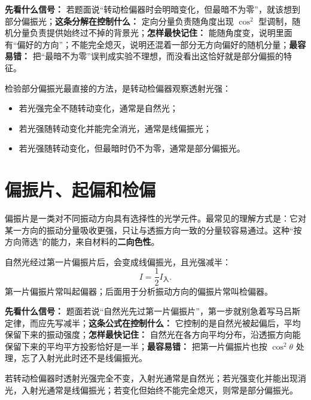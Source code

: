 \documentclass[lang=cn,11pt]{elegantbook}
\begin{document}
\begin{note}
\textbf{先看什么信号：} 若题面说“转动检偏器时会明暗变化，但最暗不为零”，就该想到部分偏振光；\textbf{这条分解在控制什么：} 定向分量负责随角度出现 \(\cos^2\) 型调制，随机分量负责提供始终过不掉的背景光；\textbf{怎样最快记住：} 能随角度变，说明里面有“偏好的方向”；不能完全熄灭，说明还混着一部分无方向偏好的随机分量；\textbf{最容易错：} 把“最暗不为零”误判成实验不理想，而没看出这恰好就是部分偏振的特征。
\end{note}

\begin{remark}
检验部分偏振光最直接的方法，是转动检偏器观察透射光强：
\begin{itemize}
  \item 若光强完全不随转动变化，通常是自然光；
  \item 若光强随转动变化并能完全消光，通常是线偏振光；
  \item 若光强随转动变化，但最暗时仍不为零，通常是部分偏振光。
\end{itemize}
\end{remark}

\section{偏振片、起偏和检偏}

偏振片是一类对不同振动方向具有选择性的光学元件。最常见的理解方式是：它对某一方向的振动分量吸收更强，只让与透振方向一致的分量较容易通过。这种“按方向筛选”的能力，来自材料的\textbf{二向色性}。

自然光经过第一片偏振片后，会变成线偏振光，且光强减半：
\[
I=\frac{1}{2}I_{\text{入}}.
\]
第一片偏振片常叫起偏器；后面用于分析振动方向的偏振片常叫检偏器。

\begin{note}
\textbf{先看什么信号：} 题面若说“自然光先过第一片偏振片”，第一步就别急着写马吕斯定律，而应先写减半；\textbf{这条公式在控制什么：} 它控制的是自然光被起偏后，平均保留下来的振动强度；\textbf{怎样最快记住：} 自然光在各方向平均分布，沿透振方向能保留下来的平均平方投影恰好是一半；\textbf{最容易错：} 把第一片偏振片也按 \(\cos^2\theta\) 处理，忘了入射光此时还不是线偏振光。
\end{note}

\begin{remark}
若转动检偏器时透射光强完全不变，入射光通常是自然光；若光强变化并能出现消光，入射光通常是线偏振光；若变化但始终不能完全熄灭，则常是部分偏振光。
\end{remark}
\end{document}
